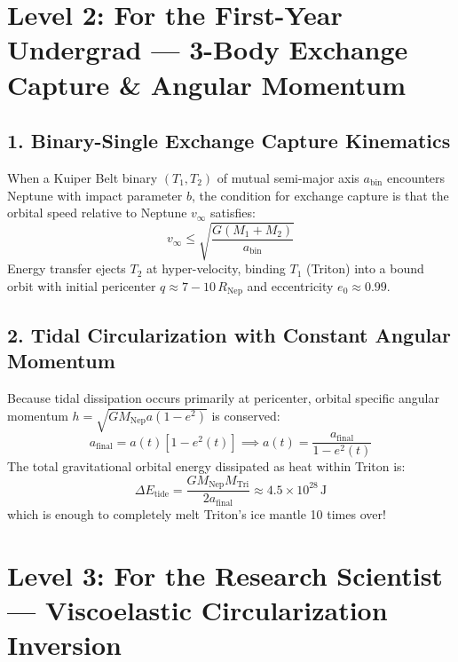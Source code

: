 \documentclass[11pt,a4paper]{article}
\begin{document}
\section*{Level 2: For the First-Year Undergrad — 3-Body Exchange Capture \& Angular Momentum}

\subsection*{1. Binary-Single Exchange Capture Kinematics}
When a Kuiper Belt binary $(T_1, T_2)$ of mutual semi-major axis $a_{\text{bin}}$ encounters Neptune with impact parameter $b$, the condition for exchange capture is that the orbital speed relative to Neptune $v_\infty$ satisfies:
\begin{equation}
v_\infty \le \sqrt{\frac{G (M_1 + M_2)}{a_{\text{bin}}}}
\end{equation}
Energy transfer ejects $T_2$ at hyper-velocity, binding $T_1$ (Triton) into a bound orbit with initial pericenter $q \approx 7 - 10\,R_{\text{Nep}}$ and eccentricity $e_0 \approx 0.99$.

\subsection*{2. Tidal Circularization with Constant Angular Momentum}
Because tidal dissipation occurs primarily at pericenter, orbital specific angular momentum $h = \sqrt{G M_{\text{Nep}} a (1 - e^2)}$ is conserved:
\begin{equation}
a_{\text{final}} = a(t) [1 - e^2(t)] \implies a(t) = \frac{a_{\text{final}}}{1 - e^2(t)}
\end{equation}
The total gravitational orbital energy dissipated as heat within Triton is:
\begin{equation}
\Delta E_{\text{tide}} = \frac{G M_{\text{Nep}} M_{\text{Tri}}}{2 a_{\text{final}}} \approx 4.5 \times 10^{28}\,\text{J}
\end{equation}
which is enough to completely melt Triton's ice mantle 10 times over!

\newpage

\section*{Level 3: For the Research Scientist — Viscoelastic Circularization Inversion}
\end{document}
